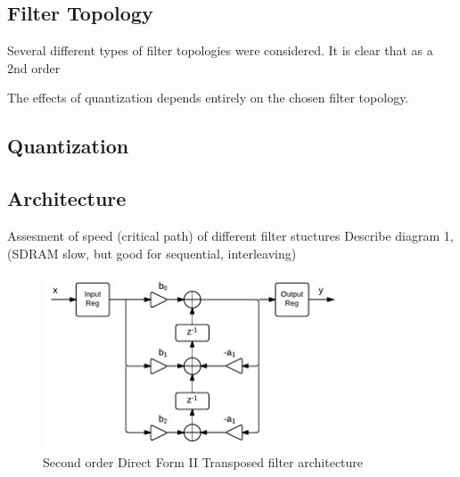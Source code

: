 \documentclass[]{article}
\begin{document}
\subsection{Filter Topology} %
\label{sub:filter_topology}

Several different types of filter topologies were considered. It is clear that as a 2nd order 

The effects of quantization depends entirely on the chosen filter topology. 


\subsection{Quantization} %
\label{sub:quantization}






\subsection{Architecture} %
\label{sub:architecture}

Assesment of speed (critical path) of different filter stuctures
Describe diagram 1, (SDRAM slow, but good for sequential, interleaving)





\begin{figure}[htbp]
	\begin{center}
		\includegraphics[width = 0.8\textwidth]{DirectFormIITransposed.pdf}
	\end{center}
	\caption{Second order Direct Form II Transposed filter architecture}
	\label{fig:df2t}
\end{figure}
\end{document}
